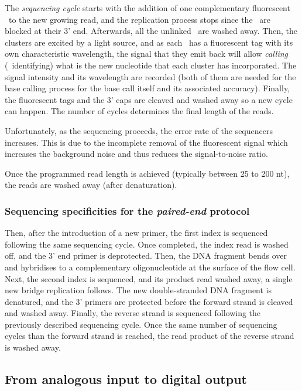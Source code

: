 The \emph{sequencing cycle} starts with the addition of one complementary
fluorescent \dNTP\ to the new growing read, and
the replication process stops since the \dNTPs\ are blocked at their 3' end.
Afterwards, all the unlinked
\dNTPs\ are washed away. Then, the clusters are excited by a light source,
and as each
\dNTPs\ has a fluorescent tag with its own characteristic wavelength, the
signal that they emit back will allow \emph{calling} (\ie\ identifying) what is the
new nucleotide that each cluster has incorporated. The signal intensity and
its wavelength are recorded (both of them are needed for the base calling
process for the base call itself and its associated accuracy). Finally,
the fluorescent tags and the 3' caps are cleaved
and washed away so a new cycle can happen.
The number of cycles determines the final length of the reads.

Unfortunately, as the sequencing proceeds, the error rate of the sequencers
increases. This is due to the incomplete removal of the fluorescent signal which
increases the background noise and thus reduces the signal-to-noise ratio.

Once the programmed read length is achieved (typically between 25 to 200 \gls{nt}),
the reads are washed away (after denaturation).

\subsubsection{Sequencing specificities for the \emph{paired-end} protocol}

Then, after the introduction of a new primer, the first index is sequenced
following the same sequencing cycle.
Once completed, the index read is washed off, and the 3' end primer is deprotected.
Then, the \gls{DNA} fragment bends over and hybridises to a complementary
oligonucleotide at the surface of the flow cell.
Next, the second index is sequenced, and its product read washed away,
a single new bridge replication follows.
The new double-stranded \gls{DNA} fragment is denatured, and the 3' primers are
protected before the forward strand is cleaved and washed away.
Finally, the reverse strand is sequenced following the previously described
sequencing cycle. Once the same number of sequencing cycles than the forward
strand is reached, the read product of the reverse strand is washed away.

\subsection{From analogous input to digital output}

